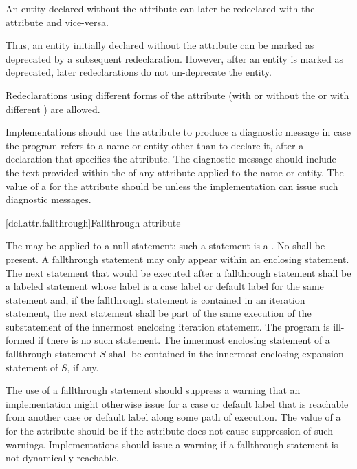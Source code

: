 \pnum
An entity declared without the  attribute can later be redeclared
with the attribute and vice-versa.
\begin{note}
Thus, an entity initially declared without the
attribute can be marked as deprecated by a subsequent redeclaration. However, after an entity
is marked as deprecated, later redeclarations do not un-deprecate the entity.
\end{note}
Redeclarations using different forms of the attribute (with or without the
 or with different
) are allowed.

\pnum
\recommended
Implementations should use the  attribute to produce a diagnostic
message in case the program refers to a name or entity other than to declare it, after a
declaration that specifies the attribute. The diagnostic message should include the text provided
within the  of any  attribute applied
to the name or entity.
The value of
a  for the  attribute
should be 
unless the implementation can issue such diagnostic messages.

[dcl.attr.fallthrough]{Fallthrough attribute}

\pnum
The  
may be applied to a null statement;
such a statement is a .
No  shall be present.
A fallthrough statement may only appear within
an enclosing  statement.
The next statement that would be executed after a fallthrough statement
shall be a labeled statement whose label is a case label or
default label for the same  statement and,
if the fallthrough statement is contained in an iteration statement,
the next statement shall be part of the same execution of
the substatement of the innermost enclosing iteration statement.
The program is ill-formed if there is no such statement.
The innermost enclosing  statement
of a fallthrough statement $S$ shall be contained in
the innermost enclosing expansion statement of $S$, if any.

\pnum
\recommended
The use of a fallthrough statement should suppress
a warning that an implementation might otherwise issue
for a case or default label that is reachable
from another case or default label along some path of execution.
The value of
a  for the  attribute
should be 
if the attribute does not cause suppression of such warnings.
Implementations should issue a warning
if a fallthrough statement is not dynamically reachable.

